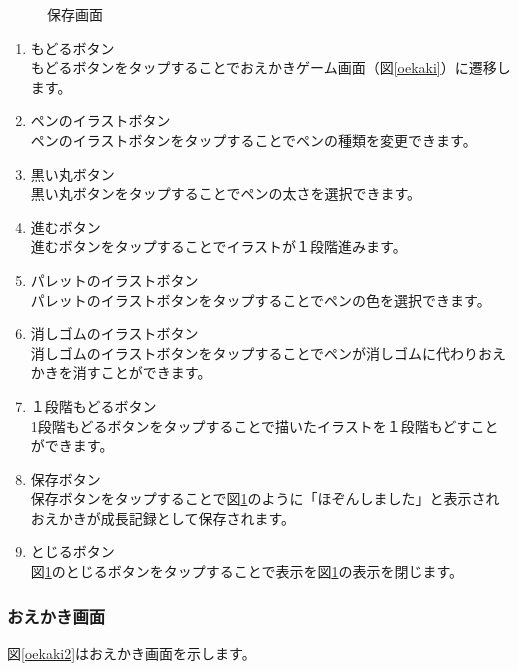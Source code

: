 \documentclass[a4j]{jarticle}
\begin{document}
\begin{figure}[H]
\begin{minipage}{0.5\hsize}
\begin{center}
    \caption {保存画面}
    \label{storage}
    \end{center}
    \end{minipage}
\end{figure}

\begin{enumerate}
  \renewcommand{\labelenumi}{\textcircled{\scriptsize \theenumi}}
\item もどるボタン\\
  もどるボタンをタップすることでおえかきゲーム画面（図\ref{oekaki}）に遷移します。
\item ペンのイラストボタン\\
  ペンのイラストボタンをタップすることでペンの種類を変更できます。
\item 黒い丸ボタン\\
  黒い丸ボタンをタップすることでペンの太さを選択できます。
\item 進むボタン\\
  進むボタンをタップすることでイラストが１段階進みます。
\item パレットのイラストボタン\\
  パレットのイラストボタンをタップすることでペンの色を選択できます。
\item 消しゴムのイラストボタン\\
  消しゴムのイラストボタンをタップすることでペンが消しゴムに代わりおえかきを消すことができます。
\item １段階もどるボタン\\
  1段階もどるボタンをタップすることで描いたイラストを１段階もどすことができます。
\item 保存ボタン\\
  保存ボタンをタップすることで図\ref{storage}のように「ほぞんしました」と表示されおえかきが成長記録として保存されます。
\item とじるボタン\\
  図\ref{storage}のとじるボタンをタップすることで表示を図\ref{storage}の表示を閉じます。
\end{enumerate}

\newpage
\subsubsection{おえかき画面}
図\ref{oekaki2}はおえかき画面を示します。\\
\end{document}
